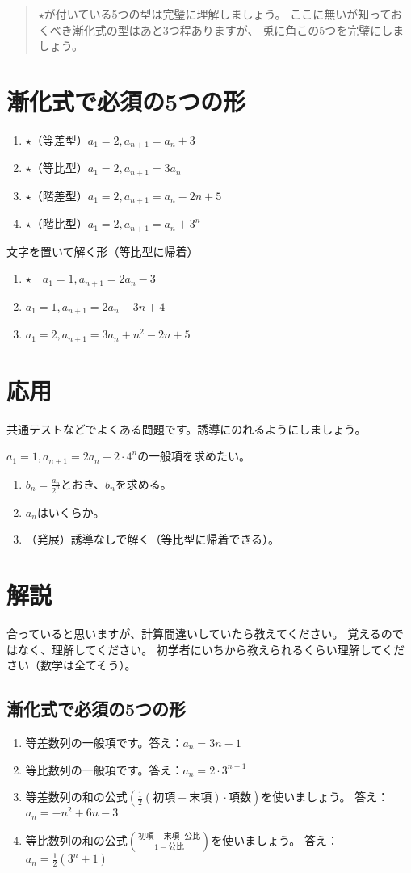 \documentclass[12pt,a4paper]{jsarticle}
\begin{document}
\begin{abstract}
    $\star$が付いている5つの型は完璧に理解しましょう。
    ここに無いが知っておくべき漸化式の型はあと3つ程ありますが、
    兎に角この5つを完璧にしましょう。
\end{abstract}
\section{漸化式で必須の5つの形}
\begin{enumerate}
    \item $\star$（等差型）$a_1=2, a_{n+1}=a_n +3$
    \item $\star$（等比型）$a_1=2, a_{n+1}=3 a_n$
    \item $\star$（階差型）$a_1=2, a_{n+1}=a_n -2n+5$
    \item $\star$（階比型）$a_1=2, a_{n+1}=a_n +3^n$
\end{enumerate}
文字を置いて解く形（等比型に帰着）
\begin{enumerate}
    \item $\star \quad a_1=1, a_{n+1}=2 a_n -3$
    \item $a_1=1, a_{n+1}=2 a_n -3n+4$
    \item $a_1=2, a_{n+1}=3a_n+n^2 -2n +5$
\end{enumerate}
\section{応用}
共通テストなどでよくある問題です。誘導にのれるようにしましょう。

$a_1=1,a_{n+1}=2a_{n}+2\cdot 4^n$の一般項を求めたい。
\begin{enumerate}
    \item $b_n=\frac{a_n}{2^n}$とおき、$b_n$を求める。
    \item $a_n$はいくらか。
    \item （発展）誘導なしで解く（等比型に帰着できる）。
\end{enumerate}
\newpage
\section{解説}
合っていると思いますが、計算間違いしていたら教えてください。
覚えるのではなく、理解してください。
初学者にいちから教えられるくらい理解してください（数学は全てそう）。
\subsection{漸化式で必須の5つの形}
\begin{enumerate}
    \item  等差数列の一般項です。答え：$a_n= 3n-1$
    \item 等比数列の一般項です。答え：$a_n=2\cdot 3^{n-1} $
    \item 等差数列の和の公式$\left(\frac{1}{2}(初項+末項)\cdot 項数\right)$を使いましょう。
    答え：$a_n=-n^2+6n-3$
    \item 等比数列の和の公式$\left(\frac{初項-末項\cdot 公比}{1-公比}\right)$を使いましょう。
    答え：$a_n=\frac{1}{2}(3^n+1)$
\end{enumerate}
\end{document}
